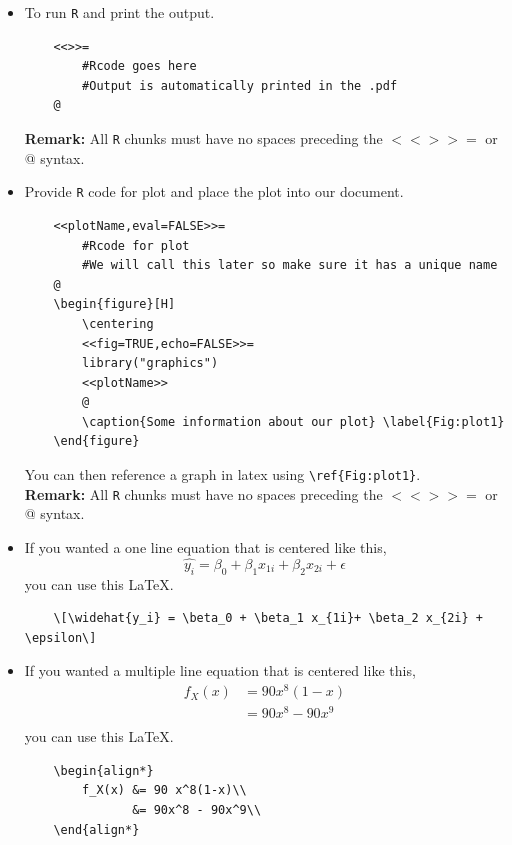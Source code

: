 \documentclass{article}
\begin{document}
	\begin{itemize}
		\item To run \texttt{R} and print the output.
	\begin{Verbatim}
	<<>>=
		#Rcode goes here
		#Output is automatically printed in the .pdf
	@
	\end{Verbatim}
		\textbf{Remark:} All \texttt{R} chunks must have no spaces preceding the $<<>>=$ or @ syntax. 
	
		\item Provide \texttt{R} code for plot and place the plot into our document.
	\begin{Verbatim}
	<<plotName,eval=FALSE>>=
		#Rcode for plot
		#We will call this later so make sure it has a unique name
	@
	\begin{figure}[H]
		\centering
		<<fig=TRUE,echo=FALSE>>=
		library("graphics")
		<<plotName>>
		@
		\caption{Some information about our plot} \label{Fig:plot1}
	\end{figure}
	\end{Verbatim}
	You can then reference a graph in latex using \verb|\ref{Fig:plot1}|.\\
	\textbf{Remark:} All \texttt{R} chunks must have no spaces preceding the $<<>>=$ or @ syntax. 
	\item If you wanted a one line equation that is centered like this,
	\[\widehat{y_i} = \beta_0 + \beta_1 x_{1i}+ \beta_2 x_{2i} + \epsilon\]
	you can use this \LaTeX.
	\begin{Verbatim}
	\[\widehat{y_i} = \beta_0 + \beta_1 x_{1i}+ \beta_2 x_{2i} + \epsilon\]
	\end{Verbatim}
	\item If you wanted a multiple line equation that is centered like this,
	\begin{align*}
		f_X(x) &= 90 x^8(1-x)\\
		       &= 90x^8 - 90x^9\\
	\end{align*}
	you can use this \LaTeX.
	\begin{Verbatim}
	\begin{align*}
		f_X(x) &= 90 x^8(1-x)\\
			   &= 90x^8 - 90x^9\\
	\end{align*}
	\end{Verbatim}

	\end{itemize}
	
\end{document}
